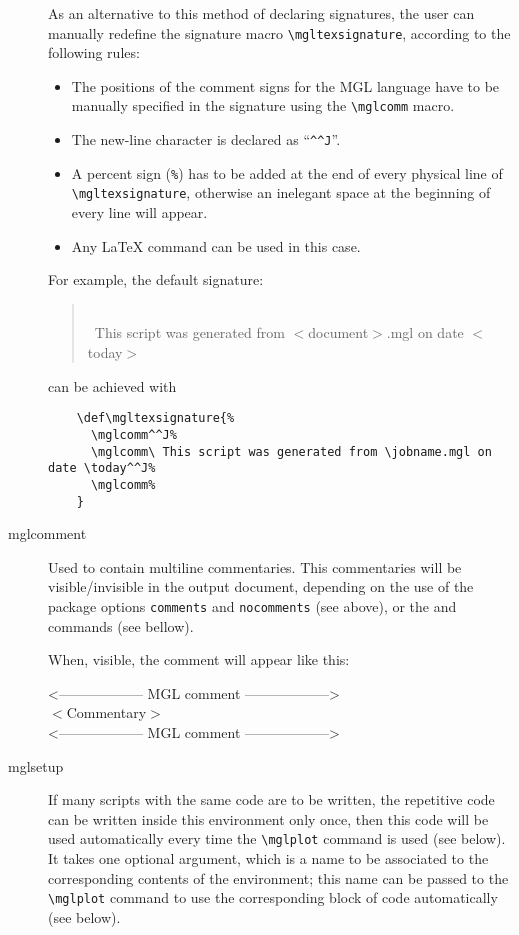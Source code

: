 \documentclass{article}
\begin{document}
\begin{description}
As an alternative to this method of declaring signatures, the user can manually redefine the signature macro \texttt{\textbackslash{}mgltexsignature}, according to the following rules:
  \begin{itemize}
    \item The positions of the comment signs for the MGL language have to be manually specified in the signature using the \texttt{\textbackslash{}mglcomm} macro.
    \item The new-line character is declared as ``\verb|^^J|''.
    \item A percent sign (\texttt{\%}) has to be added at the end of every physical line of \texttt{\textbackslash{}mgltexsignature}, otherwise an inelegant space at the beginning of every line will appear.
  \item Any \LaTeX{} command can be used in this case.
\end{itemize}
  For example, the default signature:
  \begin{mglcomment}
  \begin{quote}\small
    \mglcomm\\
    \mglcomm\ This script was generated from $<$document$>$.mgl on date $<$today$>$\\
    \mglcomm
  \end{quote}
  \end{mglcomment}
  can be achieved with
  \begin{verbatim}
    \def\mgltexsignature{%
      \mglcomm^^J%
      \mglcomm\ This script was generated from \jobname.mgl on date \today^^J%
      \mglcomm%
    }
  \end{verbatim}
\item[mglcomment]
  Used to contain multiline commentaries. This commentaries will be visible/invisible in the output document, depending on the use of the package options \texttt{comments} and \texttt{nocomments} (see above), or the \texttt{\mglcomments} and \texttt{\mglnocomments} commands (see bellow).
  
  When, visible, the comment will appear like this:
  \begin{center}
    \makeatletter
    \verbatim@font
    \makeatother
    <------------------ MGL comment ------------------>\\
    $<$Commentary$>$\\
    <------------------ MGL comment ------------------>\\
  \end{center}
\item[mglsetup]
	If many scripts with the same code are to be written, the repetitive code can be written inside this environment only once, then this code will be used automatically every time the \texttt{\textbackslash{}mglplot} command is used (see below). It takes one optional argument, which is a name to be associated to the corresponding contents of the environment; this name can be passed to the \texttt{\textbackslash{}mglplot} command to use the corresponding block of code automatically (see below).
\end{description}
\end{document}
